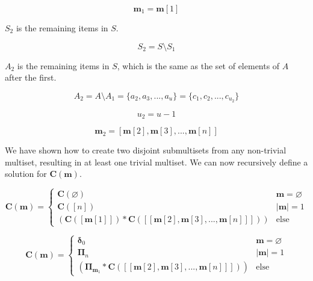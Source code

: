 \documentclass{article}
\begin{document}
\begin{equation}
    \bm{m}_1 = \bm{m}[1]
\end{equation}

$S_2$ is the remaining items in $S$.

\begin{equation}
    S_2 = S \setminus S_1
\end{equation}

$A_2$ is the remaining items in $S$, which is the same as the set of elements of $A$ after the first.

\begin{equation}
    A_2 = A \setminus A_1 = \{a_2, a_3, ..., a_u\} = \{c_1, c_2, ..., c_{u_2}\} 
\end{equation}

\begin{equation}
    u_2 = u - 1
\end{equation}

\begin{equation}
    \bm{m}_2 = [\bm{m}[2], \bm{m}[3], ..., \bm{m}[n]]
\end{equation}

We have shown how to create two disjoint submultisets from any non-trivial multiset, resulting in at least one trivial multiset. We can now recursively define a solution for $\bm{C}(\bm{m})$.

\begin{equation}
    \bm{C}(\bm{m}) = \begin{cases}
    \bm{C}(\varnothing) & \bm{m} = \varnothing \\
    \bm{C}([n]) & |\bm{m}| = 1 \\
    \left (\bm{C}([\bm{m}[1]]) * \bm{C}([[\bm{m}[2], \bm{m}[3], ..., \bm{m}[n]]]) \right ) & \text{else}
    \end{cases}
\end{equation}

\begin{equation}
    \bm{C}(\bm{m}) = \begin{cases}
    \bm{\delta}_0 & \bm{m} = \varnothing \\
    \bm{\Pi}_n & |\bm{m}| = 1 \\
    \left (\bm{\Pi}_{\bm{m}_ {1}} * \bm{C}([[\bm{m}[2], \bm{m}[3], ..., \bm{m}[n]]])\right ) & \text{else}
    \end{cases}
\end{equation}
\end{document}
